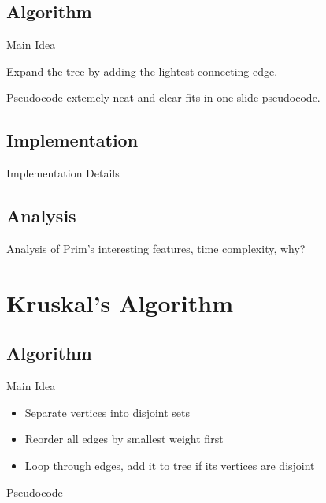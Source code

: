\documentclass{beamer}
\begin{document}
\subsection{Algorithm}
\begin{frame}{Main Idea}
    \begin{center}
    Expand the tree by adding the lightest connecting edge.
    \end{center}
\end{frame}

\begin{frame}{Pseudocode}
    extemely neat and clear fits in one slide pseudocode.
\end{frame}

\subsection{Implementation}
\begin{frame}{Implementation Details}
\end{frame}

\subsection{Analysis}
\begin{frame}{Analysis of Prim's}
    interesting features, time complexity, why?
\end{frame}


\section{Kruskal's Algorithm}\frame{\sectionpage}
\subsection{Algorithm}
\begin{frame}{Main Idea}
    \begin{itemize}
    \item Separate vertices into disjoint sets
    \item Reorder all edges by smallest weight first
    \item Loop through edges, add it to tree if its vertices are disjoint
    \end{itemize}
\end{frame}


\begin{frame}{Pseudocode}
\vkruskal
\end{frame}
\end{document}
